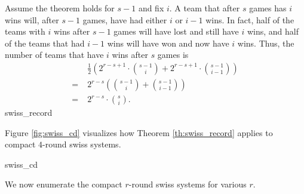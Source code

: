 {{        Assume the theorem holds for $s-1$ and fix $i$. A team that after $s$ games has $i$ wins will, after $s-1$ games, have had either $i$ or $i-1$ wins. In fact, half of the teams with $i$ wins after $s-1$ games will have lost and still have $i$ wins, and half of the teams that had $i-1$ wins will have won and now have $i$ wins. Thus,
        the number of teams that have $i$ wins after $s$ games is \begin{align*}
            &\; \frac{1}{2}\left(2^{r-s+1} \cdot \binom{s - 1}{i} + 2^{r-s+1} \cdot \binom{s - 1}{i - 1}\right)\\
            =&\; 2^{r-s} \left(\binom{s - 1 }{i} + \binom{s - 1}{i - 1}\right)\\
            =&\;2^{r-s} \cdot \binom{s }{i}.
        \end{align*}
    }{swiss_record}

    Figure \ref{fig:swiss_cd} visualizes how Theorem \ref{th:swiss_record} applies to compact $4$-round swiss systems.

    \begin{figg}{}{swiss_cd}
        \begin{center}
        \begin{tikzcd}
        \end{tikzcd}
\end{center}
    \end{figg}

    We now enumerate the compact $r$-round swiss systems for various $r$.

    }
